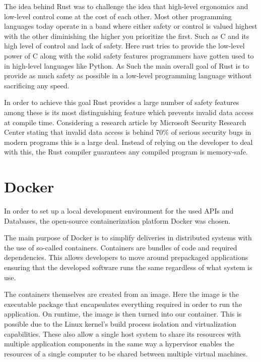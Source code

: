 The idea behind Rust was to challenge the idea that high-level ergonomics and low-level control come at the cost of each other\cite{Rust_Book}.
Most other programming languages today operate in a band where either safety or control is valued highest with the other diminishing the higher you prioritize the first. Such as C and its high level of control and lack of safety. 
Here rust tries to provide the low-level power of C along with the solid safety features programmers have gotten used to in high-level languages like Python. 
As Such the main overall goal of Rust is to provide as much safety as possible in a low-level programming language without sacrificing any speed\cite{Rust_in_Action}.

In order to achieve this goal Rust provides a large number of safety features among these is its most distinguishing feature which prevents invalid data access at compile time. 
Considering a research article by Microsoft Security Research Center stating that invalid data access is behind 70\% of serious security bugs in modern programs this is a large deal\cite{Safe_Systems_Languages}. 
Instead of relying on the developer to deal with this, the Rust compiler guarantees any compiled program is memory-safe.


\section{Docker}
In order to set up a local development environment for the used APIs and Databases, the open-source containerization platform Docker was chosen. 

The main purpose of Docker is to simplify deliveries in distributed systems with the use of so-called containers\cite{Docker_Container}.
Containers are bundles of code and required dependencies. This allows developers to move around prepackaged applications ensuring that the developed software runs the same regardless of what system is use\cite{Docker_Container}.

The containers themselves are created from an image. Here the image is the executable package that encapsulates everything required in order to run the application. On runtime, the image is then turned into our container. 
This is possible due to the Linux kernel's build process isolation and virtualization capabilities. These also allow a single host system to share its resources with multiple application components in the same way a hypervisor enables the resources of a single computer to be shared between multiple virtual machines\cite{Docker_Container}.

